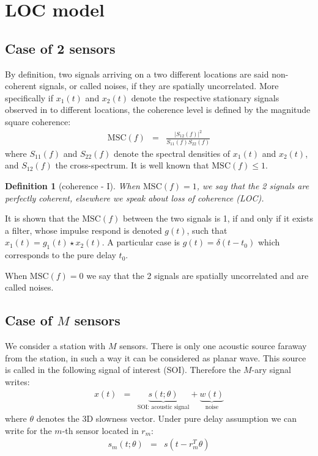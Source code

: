 \documentclass[a4paper, 12pt]{report}
\newtheorem{definition}{Definition}
\def\MSC{\mathrm{MSC}}
\begin{document}
\newpage\clearpage
 \section{LOC model}
\subsection{Case of 2 sensors}
By definition, two signals arriving on a two different locations are said non-coherent signals, or called noises, if they are spatially uncorrelated. More specifically if $x_{1}(t)$ and $x_{2}(t)$ denote the respective stationary signals observed in to different locations, the coherence level is defined by the magnitude square coherence:
\begin{eqnarray*}
 \MSC(f)&=&\frac{|S_{12}(f)|^{2}}{S_{11}(f)S_{22}(f)}
\end{eqnarray*}
where $S_{11}(f)$ and $S_{22}(f)$ denote the spectral densities of $x_{1}(t)$ and $x_{2}(t)$, and $S_{12}(f)$ the cross-spectrum. It is well known that $\MSC(f)\leq 1$. 
\begin{definition}[coherence - I]
\label{def:coherence2sensors}
When $\MSC(f)=1$, we say that the 2 signals are perfectly coherent, elsewhere we speak about loss of coherence (LOC). 
\end{definition}


It is shown that the  $\MSC(f)$ between the two signals is 1, if and only if it exists a filter, whose impulse respond is denoted $g(t)$, such that $x_{1}(t)=g_{1}(t)\star x_{2}(t)$. A particular case is $g(t)=\delta(t-t_{0})$ which corresponds to the pure delay $t_{0}$.


  \medskip
 When $\MSC(f)=0$ we say that the 2 signals are spatially uncorrelated and are called noises.



\subsection{Case of $M$ sensors}
We consider a station with $M$ sensors. There is only one acoustic source faraway from the station, in such a way it can be considered as planar wave. This source is called in the following signal of interest (SOI). Therefore the $M$-ary signal  writes: 
\begin{eqnarray*}
x(t) & = & \underbrace{s(t;\theta)}_{\text{SOI: acoustic signal}}+ \underbrace{w(t)}_{\text{noise}}
\end{eqnarray*}
where $\theta$ denotes the 3D slowness vector. Under  pure delay assumption we can write for the $m$-th sensor located in $r_{m}$:
\begin{eqnarray}
\label{eq:mthentryofst}
s_{m}(t;\theta)&=&s(t-r_{m}^{T}\theta)
\end{eqnarray}
\end{document}
